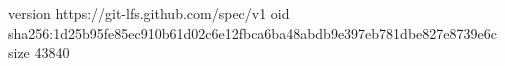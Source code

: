 version https://git-lfs.github.com/spec/v1
oid sha256:1d25b95fe85ec910b61d02c6e12fbca6ba48abdb9e397eb781dbe827e8739e6c
size 43840
